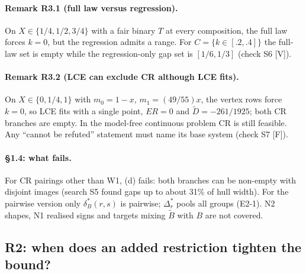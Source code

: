 \paragraph{Remark R3.1 (full law versus regression).} On $X\in\{1/4,1/2,3/4\}$ with
a fair binary $T$ at every composition, the full law forces $k=0$, but the
regression admits a range. For $C=\{k\in[.2,.4]\}$ the full-law set is empty
while the regression-only gap set is $[1/6,1/3]$ (check S6 [V]).

\paragraph{Remark R3.2 (LCE can exclude CR although LCE fits).} On
$X\in\{0,1/4,1\}$ with $m_0=1-x$, $m_1=(49/55)x$, the vertex rows force $k=0$, so
LCE fits with a single point, $ER=0$ and $\tilde D=-261/1925$; both CR branches
are empty. In the model-free continuous problem CR is still feasible. Any ``cannot
be refuted'' statement must name its base system (check S7 [F]).

\paragraph{\S1.4: what fails.} For CR pairings other than W1, (d) fails: both
branches can be non-empty with disjoint images (search S5 found gaps up to about
31\% of hull width). For the pairwise version only $\delta^*_B(r,s)$ is pairwise;
$\Delta^*_r$ pools all groups (E2-1). N2 shapes, N1 realised signs and targets
mixing $\tilde B$ with $B$ are not covered.

\subsection{R2: when does an added restriction tighten the bound?}

